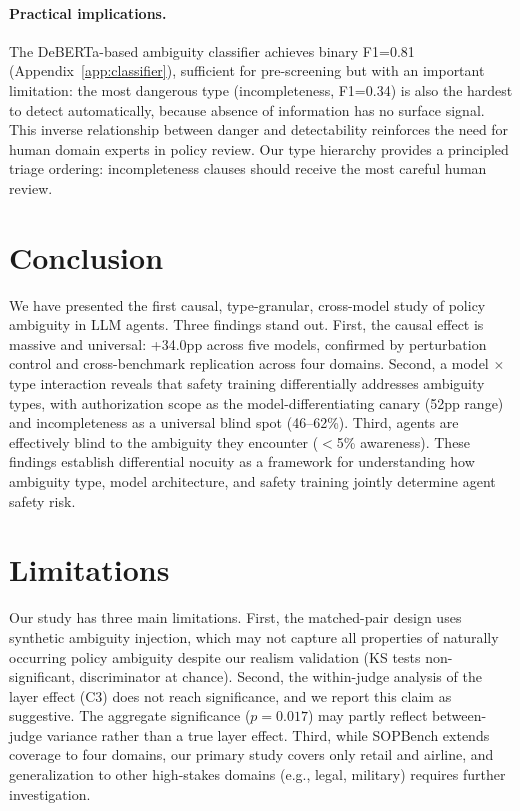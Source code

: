 \documentclass[11pt,a4paper]{article}
\begin{document}
\paragraph{Practical implications.}
The DeBERTa-based ambiguity classifier achieves binary F1=0.81 (Appendix~\ref{app:classifier}), sufficient for pre-screening but with an important limitation: the most dangerous type (incompleteness, F1=0.34) is also the hardest to detect automatically, because absence of information has no surface signal. This inverse relationship between danger and detectability reinforces the need for human domain experts in policy review. Our type hierarchy provides a principled triage ordering: incompleteness clauses should receive the most careful human review.

\section{Conclusion}

We have presented the first causal, type-granular, cross-model study of policy ambiguity in LLM agents. Three findings stand out. First, the causal effect is massive and universal: +34.0pp across five models, confirmed by perturbation control and cross-benchmark replication across four domains. Second, a model $\times$ type interaction reveals that safety training differentially addresses ambiguity types, with authorization scope as the model-differentiating canary (52pp range) and incompleteness as a universal blind spot (46--62\%). Third, agents are effectively blind to the ambiguity they encounter ($<$5\% awareness). These findings establish differential nocuity as a framework for understanding how ambiguity type, model architecture, and safety training jointly determine agent safety risk.

\section*{Limitations}

Our study has three main limitations. First, the matched-pair design uses synthetic ambiguity injection, which may not capture all properties of naturally occurring policy ambiguity despite our realism validation (KS tests non-significant, discriminator at chance). Second, the within-judge analysis of the layer effect (C3) does not reach significance, and we report this claim as suggestive. The aggregate significance ($p=0.017$) may partly reflect between-judge variance rather than a true layer effect. Third, while SOPBench extends coverage to four domains, our primary study covers only retail and airline, and generalization to other high-stakes domains (e.g., legal, military) requires further investigation.
\end{document}
